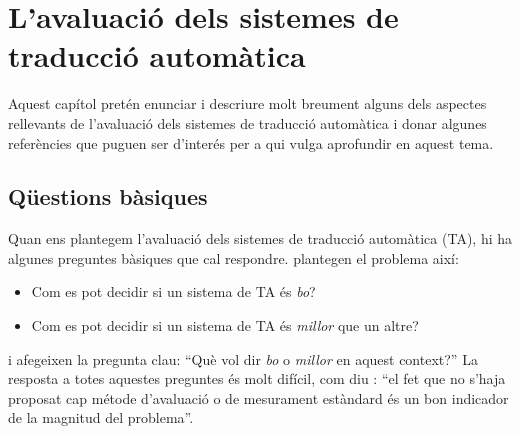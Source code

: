 \chapter[Avaluació de la traducció automàtica]{L'avaluació dels sistemes de traducció
  automàtica}
\label{se:ASTA}

Aquest capítol pretén enunciar i descriure molt breument
alguns dels aspectes rellevants de l'avaluació dels sistemes de
traducció automàtica i donar algunes referències que
puguen ser d'interés per a qui vulga aprofundir en aquest tema.

\section{Qüestions bàsiques} 
Quan ens plantegem l'avaluació dels
sistemes de traducció automàtica (TA), hi ha algunes preguntes
bàsiques que cal respondre. \citet{arnold94b} plantegen
el problema així:
\begin{itemize}
\item Com es pot decidir si un sistema de TA és \emph{bo}?
\item Com es pot decidir si un sistema de TA és \emph{millor} que
  un altre?
\end{itemize}
i afegeixen la pregunta clau: 
``Què vol dir \emph{bo} o \emph{millor} en aquest
context?'' La resposta a totes aquestes preguntes és molt difícil,
com diu \citet{minnis94j}: ``el fet que no s'haja proposat cap métode
d'avaluació o de mesurament estàndard és un bon indicador
de la magnitud del problema''. 

